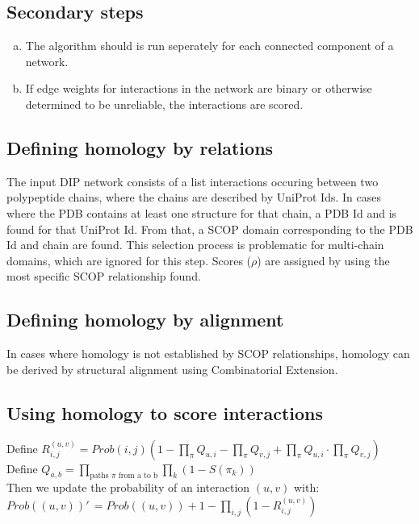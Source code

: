 \documentclass[11pt]{article}
\begin{document}
\subsection*{Secondary steps}
\begin{enumerate}[a)]
\item The algorithm should is run seperately for each connected component of a network.
\item If edge weights for interactions in the network are binary or otherwise determined to be unreliable, the interactions are scored.
\end{enumerate}

\subsection*{Defining homology by relations}

The input DIP network consists of a list interactions occuring between two polypeptide chains, where the chains are described by UniProt Ids. In cases where the PDB contains at least one structure for that chain, a PDB Id and is found for that UniProt Id. From that, a SCOP domain corresponding to the PDB Id and chain are found. This selection process is problematic for multi-chain domains, which are ignored for this step. Scores ($\rho$) are assigned by using the most specific SCOP relationship found.

\subsection*{Defining homology by alignment}

In cases where homology is not established by SCOP relationships, homology can be derived by structural alignment using Combinatorial Extension.

\subsection*{Using homology to score interactions}

Define
$R_{i,j}^{(u,v)} = Prob(i,j) \left(1 - \displaystyle \prod_\pi Q_{u,i} - \prod_\pi Q_{v,j} + \prod_\pi Q_{u,i} \cdot \prod_\pi Q_{v,j} \right)$\\
Define $Q_{a,b} = \displaystyle \prod_{\text{paths } \pi \text{ from a to b}} \prod_{k} (1 - S(\pi_k))$\\
Then we update the probability of an interaction $(u,v)$ with:\\
$Prob((u,v))'\,\! = Prob((u,v)) + 1 - \displaystyle \prod_{i,j}(1 - R_{i,j}^{(u,v)})$
\end{document}
